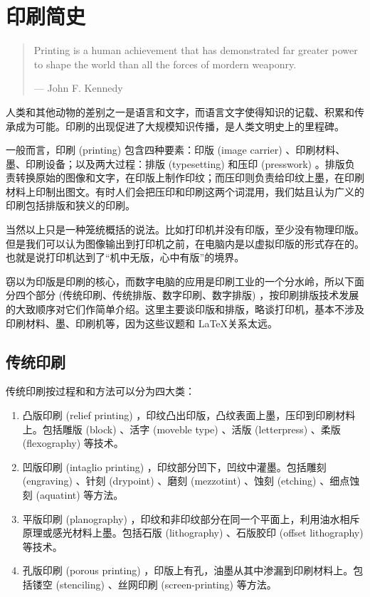 \chapter{印刷简史}
\label{chap:printing}

\begin{quotation}
Printing is a human achievement that has demonstrated far greater power to shape the world than all the forces of mordern weaponry.
\begin{flushright}
    --- John F. Kennedy
\end{flushright}
\end{quotation}

人类和其他动物的差别之一是语言和文字，而语言文字使得知识的记载、积累和传承成为可能。印刷的出现促进了大规模知识传播，是人类文明史上的里程碑。

一般而言，印刷 (printing) 包含四种要素：印版 (image carrier) 、印刷材料、墨、印刷设备；以及两大过程：排版 (typesetting) 和压印 (presswork) 。排版负责转换原始的图像和文字，在印版上制作印纹；而压印则负责给印纹上墨，在印刷材料上印制出图文。有时人们会把压印和印刷这两个词混用，我们姑且认为广义的印刷包括排版和狭义的印刷。

当然以上只是一种笼统概括的说法。比如打印机并没有印版，至少没有物理印版。但是我们可以认为图像输出到打印机之前，在电脑内是以虚拟印版的形式存在的。也就是说打印机达到了“机中无版，心中有版”的境界。

窃以为印版是印刷的核心，而数字电脑的应用是印刷工业的一个分水岭，所以下面分四个部分 (传统印刷、传统排版、数字印刷、数字排版) ，按印刷排版技术发展的大致顺序对它们作简单介绍。这里主要谈印版和排版，略谈打印机，基本不涉及印刷材料、墨、印刷机等，因为这些议题和 \LaTeX 关系太远。

\section{传统印刷}
传统印刷按过程和和方法可以分为四大类：

\begin{enumerate}
    \item 凸版印刷 (relief printing) ，印纹凸出印版，凸纹表面上墨，压印到印刷材料上。包括雕版 (block) 、活字 (moveble type) 、活版 (letterpress) 、柔版 (flexography) 等技术。
    \item 凹版印刷 (intaglio printing) ，印纹部分凹下，凹纹中灌墨。包括雕刻 (engraving) 、针刻 (drypoint) 、磨刻 (mezzotint) 、蚀刻 (etching) 、细点蚀刻 (aquatint)  等方法。
    \item 平版印刷 (planography) ，印纹和非印纹部分在同一个平面上，利用油水相斥原理或感光材料上墨。包括石版 (lithography) 、石版胶印 (offset lithography) 等技术。
    \item 孔版印刷 (porous printing) ，印版上有孔，油墨从其中渗漏到印刷材料上。包括镂空 (stenciling) 、丝网印刷 (screen-printing) 等方法。
\end{enumerate}

